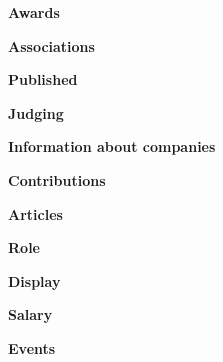 \label{ListOfExhibits}

\textbf{\Large Awards}

\textbf{\Large Associations}

\textbf{\Large Published}

\textbf{\Large Judging}

\textbf{\Large Information about companies}

\textbf{\Large Contributions}

\textbf{\Large Articles}

\textbf{\Large Role}

\textbf{\Large Display}

\textbf{\Large Salary}

\textbf{\Large Events}

\pagebreak
